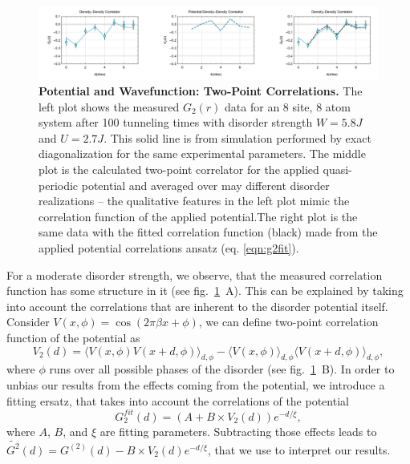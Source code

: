 \begin{figure}[t]
	\centering
	\includegraphics[width=140mm]{figures/MBL_G2Combo_Row.pdf}
	\caption{\label{fig:MBL_g2} \textbf{Potential and Wavefunction: Two-Point Correlations. } The left plot shows the measured $G_2(r)$ data for an 8 site, 8 atom system after 100 tunneling times with disorder strength $W=5.8J$ and $U=2.7J$. This solid line is from simulation performed by exact diagonalization for the same experimental parameters. The middle plot is the calculated two-point correlator for the applied quasi-periodic potential and averaged over may different disorder realizations -- the qualitative features in the left plot mimic the correlation function of the applied potential.The right plot is the same data with the fitted correlation function (black) made from the applied potential correlations ansatz (eq. \ref{eqn:g2fit}).}
\end{figure}
For a moderate disorder strength, we observe, that the measured correlation function has some structure in it (see fig.~\ref{fig:MBL_g2}~A). This can be explained by taking into account the correlations that are inherent to the disorder potential itself. Consider $V(x,\phi) = \cos{\left ( 2 \pi \beta x + \phi \right ) }$, we can define two-point correlation function of the potential as
\begin{equation}\label{eqn:v2}
V_{2}(d)= \langle V(x,\phi) V(x+d,\phi) \rangle_{d,\phi} -  \langle V(x,\phi)  \rangle_{d,\phi}  \langle V(x+d,\phi) \rangle_{d,\phi} ,
\end{equation}
where $\phi$ runs over all possible phases of the disorder (see fig.~\ref{fig:MBL_g2}~B). In order to unbias our results from the effects coming from the potential, we introduce a fitting ersatz, that takes into account the correlations of the potential
\begin{equation}\label{eqn:g2fit}
G_{2}^{fit}(d)= (A+B \times  V_2(d)) e^{-d/\xi},
\end{equation}
where $A$, $B$, and $\xi$ are fitting parameters. Subtracting those effects leads to $\widetilde{G^2}(d) = G^{(2)}(d) - B \times  V_2(d) e^{-d/\xi}$, that we use to interpret our results.

